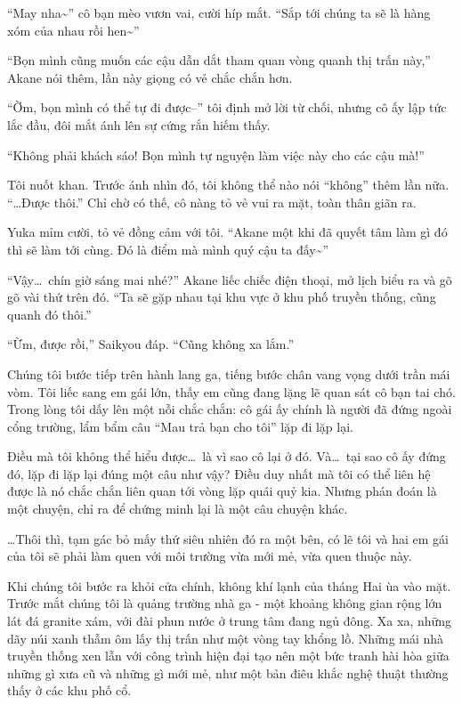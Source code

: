 \documentclass[../main.tex]{subfiles}
\begin{document}
``May nha\~{}'' cô bạn mèo vươn vai, cười híp mắt. ``Sắp tới chúng ta sẽ là hàng xóm của nhau rồi hen\~{}''

``Bọn mình cũng muốn các cậu dẫn dắt tham quan vòng quanh thị trấn này,'' Akane nói thêm, lần này giọng có vẻ chắc chắn hơn.

``Ờm, bọn mình có thể tự đi được--'' tôi định mở lời từ chối, nhưng cô ấy lập tức lắc đầu, đôi mắt ánh lên sự cứng rắn hiếm thấy.

``Không phải khách sáo! Bọn mình tự nguyện làm việc này cho các cậu mà!''

Tôi nuốt khan. Trước ánh nhìn đó, tôi không thể nào nói ``không'' thêm lần nữa. ``\dots Được thôi.'' Chỉ chờ có thế, cô nàng tỏ vẻ vui ra mặt, toàn thân giãn ra.

Yuka mỉm cười, tỏ vẻ đồng cảm với tôi. ``Akane một khi đã quyết tâm làm gì đó thì sẽ làm tới cùng. Đó là điểm mà mình quý cậu ta đấy\~{}''

``Vậy\dots\ chín giờ sáng mai nhé?'' Akane liếc chiếc điện thoại, mở lịch biểu ra và gõ gõ vài thứ trên đó. ``Ta sẽ gặp nhau tại khu vực ở khu phố truyền thống, cũng quanh đó thôi.''

``Ừm, được rồi,'' Saikyou đáp. ``Cũng không xa lắm.''

Chúng tôi bước tiếp trên hành lang ga, tiếng bước chân vang vọng dưới trần mái vòm. Tôi liếc sang em gái lớn, thấy em cũng đang lặng lẽ quan sát cô bạn tai chó. Trong lòng tôi dấy lên một nỗi chắc chắn: cô gái ấy chính là người đã đứng ngoài cổng trường, lẩm bẩm câu ``Mau trả bạn cho tôi'' lặp đi lặp lại.

Điều mà tôi không thể hiểu được\dots\ là vì sao cô lại ở đó. Và\dots\ tại sao cô ấy đứng đó, lặp đi lặp lại đúng một câu như vậy? Điều duy nhất mà tôi có thể liên hệ được là nó chắc chắn liên quan tới vòng lặp quái quỷ kia. Nhưng phán đoán là một chuyện, chỉ ra để chứng minh lại là một câu chuyện khác.

\dots Thôi thì, tạm gác bỏ mấy thứ siêu nhiên đó ra một bên, có lẽ tôi và hai em gái của tôi sẽ phải làm quen với môi trường vừa mới mẻ, vừa quen thuộc này.

\ct

Khi chúng tôi bước ra khỏi cửa chính, không khí lạnh của tháng Hai ùa vào mặt. Trước mắt chúng tôi là quảng trường nhà ga - một khoảng không gian rộng lớn lát đá granite xám, với đài phun nước ở trung tâm đang ngủ đông. Xa xa, những dãy núi xanh thẫm ôm lấy thị trấn như một vòng tay khổng lồ. Những mái nhà truyền thống xen lẫn với công trình hiện đại tạo nên một bức tranh hài hòa giữa những gì xưa cũ và những gì mới mẻ, như một bản điêu khắc nghệ thuật thường thấy ở các khu phố cổ.
\end{document}
